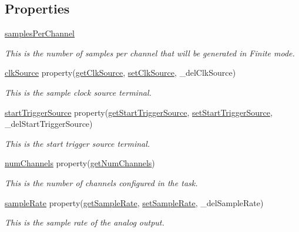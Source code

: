 \subsection*{Properties}
\begin{DoxyCompactItemize}
\item 
\hyperlink{class_analog_output_1_1_analog_output_a3b52a2dd204f53dd5e5573011c1399e8}{samples\-Per\-Channel}
\begin{DoxyCompactList}\small\item\em This is the number of samples per channel that will be generated in Finite mode. \end{DoxyCompactList}\item 
\hyperlink{class_analog_output_1_1_analog_output_ab35cc7e572968599d8f2fc4df8e3d7e2}{clk\-Source} property(\hyperlink{class_analog_output_1_1_analog_output_a82c8ed528235961775dd386c7fab6587}{get\-Clk\-Source}, \hyperlink{class_analog_output_1_1_analog_output_a888663bef5a41818e2dadca65c56f4fc}{set\-Clk\-Source}, \-\_\-del\-Clk\-Source)
\begin{DoxyCompactList}\small\item\em This is the sample clock source terminal. \end{DoxyCompactList}\item 
\hyperlink{class_analog_output_1_1_analog_output_a6fb285ae88ea470ec5a99f9163e36c88}{start\-Trigger\-Source} property(\hyperlink{class_analog_output_1_1_analog_output_adcb04886fe1b222cbbf4ec8ab3c01153}{get\-Start\-Trigger\-Source}, \hyperlink{class_analog_output_1_1_analog_output_a9dacc2895d366a28732d480fd632ad80}{set\-Start\-Trigger\-Source}, \-\_\-del\-Start\-Trigger\-Source)
\begin{DoxyCompactList}\small\item\em This is the start trigger source terminal. \end{DoxyCompactList}\item 
\hyperlink{class_analog_output_1_1_analog_output_a0ca884b5b69a1e37758b6ea74f5e2b6f}{num\-Channels} property(\hyperlink{class_analog_output_1_1_analog_output_af833d97ef4cb7cc53ac7eba7e69eb1ad}{get\-Num\-Channels})
\begin{DoxyCompactList}\small\item\em This is the number of channels configured in the task. \end{DoxyCompactList}\item 
\hyperlink{class_analog_output_1_1_analog_output_a493b9db1346a6d9cceae925ad85a3fef}{sample\-Rate} property(\hyperlink{class_analog_output_1_1_analog_output_a19e38c3a77a064c52db37c48099684ce}{get\-Sample\-Rate}, \hyperlink{class_analog_output_1_1_analog_output_a20285eba22830949eb40ce15270655dd}{set\-Sample\-Rate}, \-\_\-del\-Sample\-Rate)
\begin{DoxyCompactList}\small\item\em This is the sample rate of the analog output. \end{DoxyCompactList}\end{DoxyCompactItemize}


